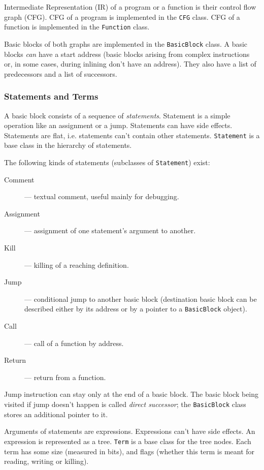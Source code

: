 \documentclass[a4paper,12pt]{article}
\newcommand{\ident}[1]{\texttt{#1}}
\begin{document}
Intermediate Representation (IR) of a program or a function is their control flow graph (CFG).
CFG of a program is implemented in the \ident{CFG} class.
CFG of a function is implemented in the \ident{Function} class.

Basic blocks of both graphs are implemented in the \ident{BasicBlock} class.
A basic blocks \emph{can} have a start address (basic blocks arising from complex instructions or, in some cases, during inlining don't have an address).
They also have a list of predecessors and a list of successors.

\subsubsection{Statements and Terms}

A basic block consists of a sequence of \emph{statements}.
Statement is a simple operation like an assignment or a jump.
Statements can have side effects.
Statements are flat, i.e. statements can't contain other statements.
\ident{Statement} is a base class in the hierarchy of statements.

The following kinds of statements (subclasses of \ident{Statement}) exist:
\begin{description}
\item[Comment] --- textual comment, useful mainly for debugging.
\item[Assignment] --- assignment of one statement's argument to another.
\item[Kill] --- killing of a reaching definition.
\item[Jump] --- conditional jump to another basic block (destination basic block can be described either by its address or by a pointer to a \ident{BasicBlock} object).
\item[Call] --- call of a function by address.
\item[Return] --- return from a function.
\end{description}

Jump instruction can stay only at the end of a basic block.
The basic block being visited if jump doesn't happen is called \emph{direct successor}; the \ident{BasicBlock} class stores an additional pointer to it.

Arguments of statements are expressions.
Expressions can't have side effects.
An expression is represented as a tree.
\ident{Term} is a base class for the tree nodes.
Each term has some size (measured in bits), and flags (whether this term is meant for reading, writing or killing).
\end{document}
